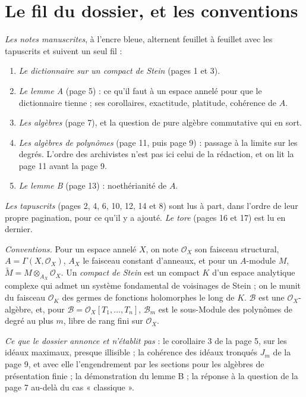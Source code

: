 \documentclass[11pt,a4paper]{article}
\begin{document}
\section*{Le fil du dossier, et les conventions}

\emph{Les notes manuscrites}, à l'encre bleue, alternent feuillet à feuillet
avec les tapuscrits et suivent un seul fil :

\begin{enumerate}
\item[1.] \emph{Le dictionnaire sur un compact de Stein} (pages 1 et 3).
\item[2.] \emph{Le lemme A} (page 5) : ce qu'il faut à un espace annelé pour
que le dictionnaire tienne ; ses corollaires, exactitude, platitude,
cohérence de $A$.
\item[3.] \emph{Les algèbres} (page 7), et la question de pure algèbre
commutative qui en sort.
\item[4.] \emph{Les algèbres de polynômes} (page 11, puis page 9) : passage à
la limite sur les degrés. L'ordre des archivistes n'est pas ici celui de la
rédaction, et on lit la page 11 avant la page 9.
\item[5.] \emph{Le lemme B} (page 13) : noethérianité de $A$.
\end{enumerate}

\emph{Les tapuscrits} (pages 2, 4, 6, 10, 12, 14 et 8) sont lus à part, dans
l'ordre de leur propre pagination, pour ce qu'il y a ajouté. \emph{Le tore}
(pages 16 et 17) est lu en dernier.

\emph{Conventions.} Pour un espace annelé $X$, on note $\mathcal{O}_{X}$ son
faisceau structural, $A = \Gamma(X, \mathcal{O}_{X})$, $A_{X}$ le faisceau
constant d'anneaux, et pour un $A$-module $M$,
$\widetilde{M} = M \otimes_{A_{X}} \mathcal{O}_{X}$. Un \emph{compact de
Stein} est un compact $K$ d'un espace analytique complexe qui admet un système
fondamental de voisinages de Stein ; on le munit du faisceau
$\mathcal{O}_{K}$ des germes de fonctions holomorphes le long de $K$.
$\mathcal{B}$ est une $\mathcal{O}_{X}$-algèbre, et, pour
$\mathcal{B} = \mathcal{O}_{X}[T_{1}, \ldots, T_{n}]$, $\mathcal{B}_{m}$ est
le sous-Module des polynômes de degré au plus $m$, libre de rang fini sur
$\mathcal{O}_{X}$.

\emph{Ce que le dossier annonce et n'établit pas} : le corollaire 3 de la page
5, sur les idéaux maximaux, presque illisible ; la cohérence des idéaux
tronqués $J_{m}$ de la page 9, et avec elle l'engendrement par les sections
pour les algèbres de présentation finie ; la démonstration du lemme B ; la
réponse à la question de la page 7 au-delà du cas « classique ».
\end{document}

